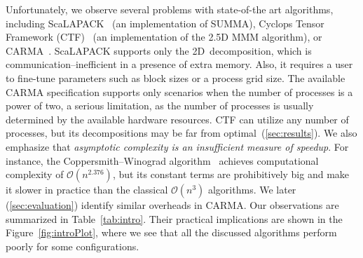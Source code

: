 \documentclass[sigplan,review,anonymous,10pt]{acmart}\settopmatter{printfolios=true,printccs=false,printacmref=false}
\begin{document}


Unfortunately, we observe several problems with state-of-the art
algorithms, including ScaLAPACK~\cite{scalapack} (an implementation of
SUMMA), Cyclops Tensor Framework (CTF)~\cite{cyclops} (an implementation of the 
2.5D MMM algorithm), or CARMA~\cite{CARMA}. ScaLAPACK supports
only the 2D~decomposition, which is communication--inefficient in a presence of 
extra memory. Also, it requires a 
user to
fine-tune parameters such as block sizes or a process
grid size. The available CARMA specification supports only scenarios when the 
number of
processes is a power of two, a serious limitation, as the number of processes 
is usually determined by the available
hardware resources.
CTF can utilize any number of processes, but its decompositions may be far from 
optimal~(\cref{sec:results}). We also emphasize that 
\emph{asymptotic 
complexity is an insufficient measure of speedup}. For instance, the
Coppersmith--Winograd algorithm~\cite{coppersmith} achieves computational
complexity of $\mathcal{O}(n^{2.376})$, but its constant terms are 
prohibitively big and
make it slower in practice than the classical $\mathcal{O}(n^{3})$ algorithms. 
We later (\cref{sec:evaluation}) identify similar overheads in CARMA. Our 
observations are summarized in Table~\ref{tab:intro}. Their practical 
implications are shown in the Figure~\ref{fig:introPlot}, where we see that all 
the discussed algorithms perform poorly for some configurations. 
\end{document}
